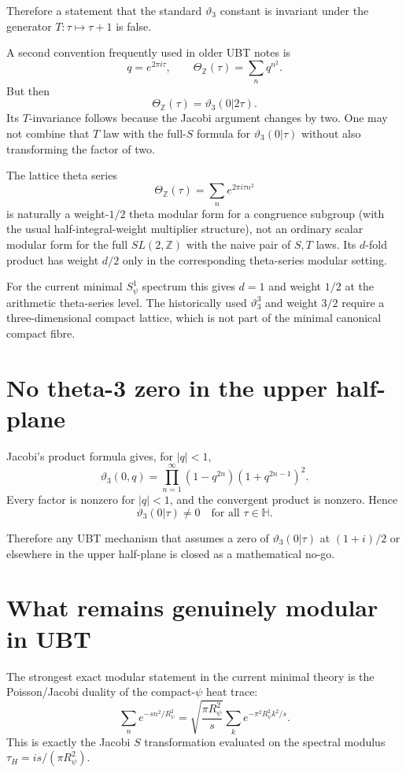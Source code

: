 \documentclass[11pt,a4paper]{article}
\begin{document}
Therefore a statement that the standard $\vartheta_3$ constant is invariant
under the generator $T:\tau\mapsto\tau+1$ is false.

A second convention frequently used in older UBT notes is
\[
 q=e^{2\pi i\tau},
 \qquad
 \Theta_{\mathbb Z}(\tau)=\sum_n q^{n^2}.
\]
But then
\[
 \boxed{
 \Theta_{\mathbb Z}(\tau)=\vartheta_3(0|2\tau).
 }
\]
Its $T$-invariance follows because the Jacobi argument changes by two.
One may not combine that $T$ law with the full-$S$ formula for
$\vartheta_3(0|\tau)$ without also transforming the factor of two.

The lattice theta series
\[
 \Theta_{\mathbb Z}(\tau)=\sum_n e^{2\pi i\tau n^2}
\]
is naturally a weight-$1/2$ theta modular form for a congruence subgroup
(with the usual half-integral-weight multiplier structure), not an ordinary
scalar modular form for the full $SL(2,\mathbb Z)$ with the naive pair of
$S,T$ laws.  Its $d$-fold product has weight $d/2$ only in the corresponding
theta-series modular setting.

For the current minimal $S^1_\psi$ spectrum this gives $d=1$ and weight
$1/2$ at the arithmetic theta-series level.  The historically used
$\vartheta_3^3$ and weight $3/2$ require a three-dimensional compact lattice,
which is not part of the minimal canonical compact fibre.

\section{No theta-3 zero in the upper half-plane}

Jacobi's product formula gives, for $|q|<1$,
\[
 \vartheta_3(0,q)
 =\prod_{n=1}^{\infty}
 (1-q^{2n})(1+q^{2n-1})^2 .
\]
Every factor is nonzero for $|q|<1$, and the convergent product is nonzero.
Hence
\[
 \boxed{
 \vartheta_3(0|\tau)\ne0
 \quad\text{for all }\tau\in\mathbb H.
 }
\]

Therefore any UBT mechanism that assumes a zero of
$\vartheta_3(0|\tau)$ at $(1+i)/2$ or elsewhere in the upper half-plane is
closed as a mathematical no-go.

\section{What remains genuinely modular in UBT}

The strongest exact modular statement in the current minimal theory is the
Poisson/Jacobi duality of the compact-$\psi$ heat trace:
\[
 \sum_n e^{-s n^2/R_\psi^2}
 =
 \sqrt{\frac{\pi R_\psi^2}{s}}
 \sum_k e^{-\pi^2R_\psi^2k^2/s}.
\]
This is exactly the Jacobi $S$ transformation evaluated on the spectral
modulus $\tau_H=i s/(\pi R_\psi^2)$.
\end{document}
